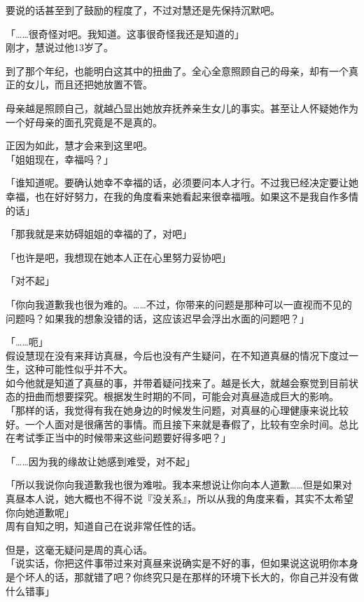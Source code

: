 要说的话甚至到了鼓励的程度了，不过对慧还是先保持沉默吧。

「……很奇怪对吧。我知道。这事很奇怪我还是知道的」\\

刚才，慧说过他13岁了。

到了那个年纪，也能明白这其中的扭曲了。全心全意照顾自己的母亲，却有一个真正的女儿，而且还把她放置不管。

母亲越是照顾自己，就越凸显出她放弃抚养亲生女儿的事实。甚至让人怀疑她作为一个好母亲的面孔究竟是不是真的。

正因为如此，慧才会来到这里吧。\\

「姐姐现在，幸福吗？」

「谁知道呢。要确认她幸不幸福的话，必须要问本人才行。不过我已经决定要让她幸福，也在好好努力，在我的角度看来她看起来很幸福哦。如果这不是我自作多情的话」

「那我就是来妨碍姐姐的幸福的了，对吧」

「也许是吧，我想现在她本人正在心里努力妥协吧」

「对不起」

「你向我道歉我也很为难的。……不过，你带来的问题是那种可以一直视而不见的问题吗？如果我的想象没错的话，这应该迟早会浮出水面的问题吧？」

「……呃」\\

假设慧现在没有来拜访真昼，今后也没有产生疑问，在不知道真昼的情况下度过一生，这种可能性似乎并不大。\\

如今他就是知道了真昼的事，并带着疑问找来了。越是长大，就越会察觉到目前状态的扭曲而想要探究。根据发生时期的不同，可能会对真昼造成巨大的影响。\\

「那样的话，我觉得有我在她身边的时候发生问题，对真昼的心理健康来说比较好。一个人面对是很痛苦的事情。而且接下来就是春假了，比较有空余时间。总比在考试季正当中的时候带来这些问题要好得多吧？」

「……因为我的缘故让她感到难受，对不起」

「所以我说你向我道歉我也很为难啦。我本来想说让你向本人道歉……但是如果对真昼本人说，她大概也不得不说『没关系』，所以从我的角度来看，其实不太希望你向她道歉呢」\\

周有自知之明，知道自己在说非常任性的话。

但是，这毫无疑问是周的真心话。\\

「说实话，你把这件事带过来对真昼来说确实是不好的事，但如果说这说明你本身是个坏人的话，那就错了吧？你终究只是在那样的环境下长大的，你自己并没有做什么错事」\\

